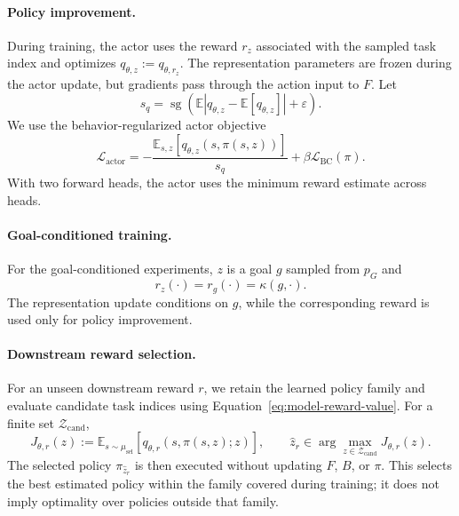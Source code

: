 \documentclass[11pt]{article}
\newcommand{\sg}{\operatorname{sg}}
\begin{document}
\paragraph{Policy improvement.}
During training, the actor uses the reward $r_z$ associated with the sampled task index and optimizes $q_{\theta,z}:=q_{\theta,r_z}$. The representation parameters are frozen during the actor update, but gradients pass through the action input to $F$. Let
\begin{equation}
    s_q
    =
    \sg\left(
        \mathbb E
        \left|
            q_{\theta,z}
            -
            \mathbb E[q_{\theta,z}]
        \right|
        +
        \varepsilon
    \right).
    \label{eq:q-scale}
\end{equation}
We use the behavior-regularized actor objective
\begin{equation}
    \mathcal L_{\mathrm{actor}}
    =
    -
    \frac{
        \mathbb E_{s,z}
        \left[
            q_{\theta,z}(s,\pi(s,z))
        \right]
    }{
        s_q
    }
    +
    \beta\mathcal L_{\mathrm{BC}}(\pi).
    \label{eq:actor-centered}
\end{equation}
With two forward heads, the actor uses the minimum reward estimate across heads.

\paragraph{Goal-conditioned training.}
For the goal-conditioned experiments, $z$ is a goal $g$ sampled from $p_G$ and
\[
    r_z(\cdot)=r_g(\cdot)=\kappa(g,\cdot).
\]
The representation update conditions on $g$, while the corresponding reward is used only for policy improvement.

\paragraph{Downstream reward selection.}
For an unseen downstream reward $r$, we retain the learned policy family and evaluate candidate task indices using Equation~\eqref{eq:model-reward-value}. For a finite set $\mathcal Z_{\mathrm{cand}}$,
\begin{equation}
    J_{\theta,r}(z)
    :=
    \mathbb E_{s\sim\mu_{\mathrm{sel}}}
    \left[
        q_{\theta,r}(s,\pi(s,z);z)
    \right],
    \qquad
    \hat z_r
    \in
    \arg\max_{z\in\mathcal Z_{\mathrm{cand}}}
    J_{\theta,r}(z).
    \label{eq:policy-search}
\end{equation}
The selected policy $\pi_{\hat z_r}$ is then executed without updating $F$, $B$, or $\pi$. This selects the best estimated policy within the family covered during training; it does not imply optimality over policies outside that family.
\end{document}
